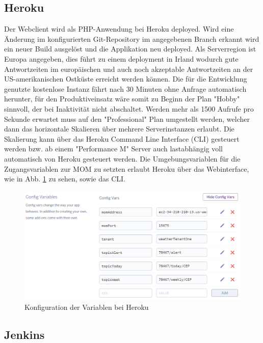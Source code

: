 \subsection{Heroku}\label{Heroku}
Der Webclient wird als PHP-Anwendung bei Heroku deployed. Wird eine Änderung im konfigurierten Git-Repository  im angegebenen Branch erkannt wird ein neuer Build ausgelöst und die Applikation neu deployed. Als Serverregion ist Europa angegeben, dies führt zu einem deployment in Irland wodurch gute Antwortzeiten im europäischen und auch noch akzeptable Antwortzeiten an der US-amerikanischen Ostküste erreicht werden können. Die für die Entwicklung genutzte kostenlose Instanz fährt nach 30 Minuten ohne Anfrage automatisch herunter, für den Produktiveinsatz wäre somit zu Beginn der Plan "Hobby" sinnvoll, der bei Inaktivität nicht abschaltet. Werden mehr als 1500 Aufrufe pro Sekunde erwartet muss auf den "Professional" Plan umgestellt werden, welcher dann das horizontale Skalieren über mehrere Serverinstanzen erlaubt. Die Skalierung kann über das Heroku Command Line Interface (CLI) gesteuert werden bzw. ab einem "Performance M" Server auch lastabhängig voll automatisch von Heroku gesteuert werden. Die Umgebungsvariablen für die Zugangsvariablen zur MOM zu setzten erlaubt Heroku über das Webinterface, wie in Abb. \ref{img:herokuConf} zu sehen, sowie das CLI.
\begin{figure}[htbp]
	\centering
	\includegraphics[width=1.0\textwidth]{Bilder/Web-herokuEnv.PNG}
	\caption{Konfiguration der Variablen bei Heroku}
	\label{img:herokuConf}
\end{figure} 


\subsection{Jenkins}\label{Jenkins}
